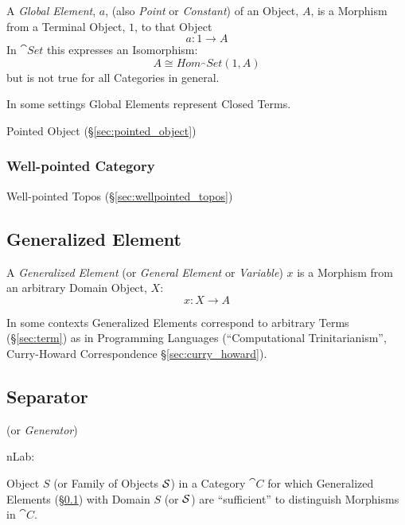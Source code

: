 A \emph{Global Element}, $a$, (also \emph{Point} or \emph{Constant})
of an Object, $A$, is a Morphism from a Terminal Object, $1$, to that
Object
\[
  a: 1 \rightarrow A
\]
In $\cat{Set}$ this expresses an Isomorphism:
\[
  A \cong Hom_\cat{Set}(1,A)
\]
but is not true for all Categories in general.

In some settings Global Elements represent Closed Terms.

Pointed Object (\S\ref{sec:pointed_object})



\subsubsection{Well-pointed Category}\label{sec:well_pointed}

Well-pointed Topos (\S\ref{sec:wellpointed_topos})



\subsection{Generalized Element}\label{sec:generalized_element}

A \emph{Generalized Element} (or \emph{General Element} or
\emph{Variable}) $x$ is a Morphism from an arbitrary Domain Object,
$X$:
\[
  x: X \rightarrow A
\]

In some contexts Generalized Elements correspond to arbitrary Terms
(\S\ref{sec:term}) as in Programming Languages (``Computational
Trinitarianism'', Curry-Howard Correspondence
\S\ref{sec:curry_howard}).



\subsection{Separator}\label{sec:separator}

(or \emph{Generator})

nLab:

Object $S$ (or Family of Objects $\mathcal{S}$) in a Category $\cat{C}$
for which Generalized Elements (\S\ref{sec:generalized_element}) with
Domain $S$ (or $\mathcal{S}$) are ``sufficient'' to distinguish
Morphisms in $\cat{C}$.

